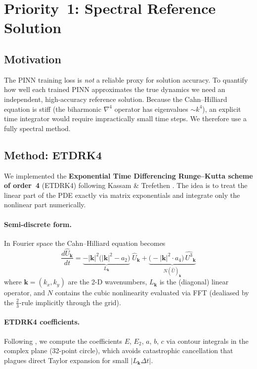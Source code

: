 \documentclass[11pt,a4paper]{article}
\begin{document}
\section{Priority~1: Spectral Reference Solution}
\label{sec:spectral}

\subsection{Motivation}

The PINN training loss is \emph{not} a reliable proxy for solution
accuracy.  To quantify how well each trained PINN approximates the true
dynamics we need an independent, high-accuracy reference solution.
Because the Cahn--Hilliard equation is stiff (the biharmonic
$\nabla^4$ operator has eigenvalues $\sim k^4$), an explicit time
integrator would require impractically small time steps.  We therefore
use a fully spectral method.

\subsection{Method: ETDRK4}
\label{sec:etdrk4}

We implemented the \textbf{Exponential Time Differencing Runge--Kutta
scheme of order~4} (ETDRK4) following Kassam \& Trefethen
\cite{kassam2005}.  The idea is to treat the linear part of the PDE
exactly via matrix exponentials and integrate only the nonlinear part
numerically.

\paragraph{Semi-discrete form.}
In Fourier space the Cahn--Hilliard equation becomes
\begin{equation}
  \frac{d\hat{U}_{\bm{k}}}{dt}
  = \underbrace{-|\bm{k}|^2\bigl(|\bm{k}|^2 - a_2\bigr)}_{L_{\bm{k}}}\;
    \hat{U}_{\bm{k}}
  + \underbrace{\bigl(-|\bm{k}|^2 \cdot a_4\bigr)\,
    \widehat{U^3}_{\bm{k}}}_{N(\hat{U})_{\bm{k}}}
  \label{eq:fourier-ch}
\end{equation}
where $\bm{k} = (k_x, k_y)$ are the 2-D wavenumbers, $L_{\bm{k}}$ is
the (diagonal) linear operator, and $N$ contains the cubic nonlinearity
evaluated via FFT (dealiased by the $\tfrac{2}{3}$-rule implicitly
through the grid).

\paragraph{ETDRK4 coefficients.}
Following \cite{kassam2005}, we compute the coefficients $E$, $E_2$,
$a$, $b$, $c$ via contour integrals in the complex plane (32-point
circle), which avoids catastrophic cancellation that plagues direct
Taylor expansion for small $|L_{\bm{k}} \Delta t|$.
\end{document}
